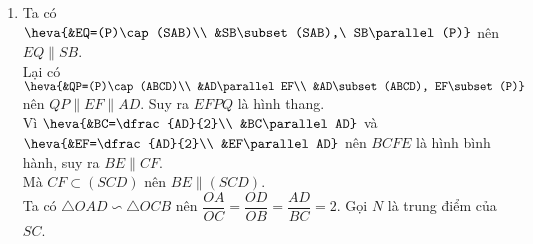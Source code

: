 \begin{ex}
{		%
		\begin{enumerate}
			\item Ta có $ \heva{&EQ=(P)\cap(SAB)\\ &SB\subset (SAB),\ SB\parallel (P)}$ nên $ EQ\parallel SB $.\\
			      Lại có $ \heva{&QP=(P)\cap (ABCD)\\ &AD\parallel EF\\ &AD\subset (ABCD), EF\subset (P)} $ nên $ QP\parallel EF\parallel AD $. Suy ra $ EFPQ $ là hình thang.\\
			      Vì $ \heva{&BC=\dfrac{AD}{2}\\ &BC\parallel AD} $ và $ \heva{&EF=\dfrac{AD}{2}\\ &EF\parallel AD} $ nên $ BCFE $ là hình bình hành, suy ra $ BE\parallel CF $.\\
			      Mà $ CF\subset (SCD) $ nên $ BE\parallel (SCD) $.\\
			      Ta có $ \triangle OAD\backsim\triangle OCB $ nên $ \dfrac{OA}{OC}=\dfrac{OD}{OB}=\dfrac{AD}{BC}=2 $. Gọi $ N $ là trung điểm của $ SC $.\\

\end{enumerate}}
\end{ex}
